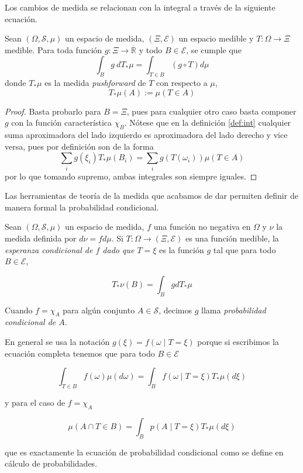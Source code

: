 \documentclass[main.tex]{subfiles}
\begin{document}
Los cambios de medida se relacionan con la integral a través de la siguiente ecuación.

\begin{lemma}\label{lemma:trans-int}
	Sean $(\Omega, \mathcal{S}, \mu)$ un espacio de medida, $(\Xi, \mathcal{E})$ un espacio medible y $T:\Omega \to \Xi$ medible. Para toda función $g:\Xi \to \overline{\mathbb{R}}$ y todo $B\in\mathcal{E}$, se cumple que
	\begin{equation*}
		\int _Bg\ dT_*\mu=\int_{T\in B}(g\circ T)d\mu
	\end{equation*} 
	donde $T_*\mu$ es la medida \textit{pushforward} de $T$ con respecto a $\mu$,  
	\begin{equation*}
		T_*\mu(A):=\mu(T\in A)
	\end{equation*}
\end{lemma}
\begin{proof}
Basta probarlo para $B=\Xi$, pues para cualquier otro caso basta componer $g$ con la función característica $\chi_B$. Nótese que en la definición \ref{def:int} cualquier suma aproximadora del lado izquierdo es aproximadora del lado derecho y vice versa, pues por definición son de la forma
\begin{equation*}
	\sum_i g(\xi_i)T_*\mu(B_i) = \sum_i g\left(T(\omega_i)\right)\mu(T \in A)
\end{equation*}
por lo que tomando supremo, ambas integrales son siempre iguales.
\end{proof}

Las herramientas de teoría de la medida que acabamos de dar permiten definir de manera formal la probabilidad condicional.

\begin{definition}
Sean $(\Omega, \mathcal{S}, \mu)$ un espacio de medida, $f$ una función no negativa en $\Omega$  y $\nu$ la medida definida por $d\nu = fd\mu$. Si $T:\Omega \to (\Xi, \mathcal{E})$ es una función medible, la  \textit{esperanza condicional de $f$ dado que $T=\xi$} es la función $g$ tal que para todo $B\in\mathcal{E}$,

\begin{equation*}
	T_*\nu(B) = \int_B gdT_*\mu
\end{equation*}

Cuando $f=\chi_A$ para algún conjunto $A\in\mathcal{S}$, decimos $g$ llama \textit{probabilidad condicional de $A$}.
\end{definition}

En general se usa la notación $g(\xi) = f\left(\omega \mid T=\xi\right)$ porque si escribimos la ecuación completa tenemos que para todo $B\in\mathcal{E}$

\begin{equation*}
	\int_{T\in B} f(\omega)\mu(d\omega)
	= \int _B f(\omega \mid T=\xi)T_*\mu(d\xi)
\end{equation*}

y para el caso de $f=\chi_A$

\begin{equation*}
\mu\left(A\cap T\in B\right) = 
	\int _B p(A \mid T=\xi)T_*\mu(d\xi) 	
\end{equation*}

que es exactamente la ecuación de probabilidad condicional como se define en cálculo de probabilidades.
\end{document}

